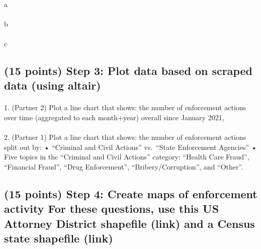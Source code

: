 \documentclass[
  letterpaper,
  DIV=11,
  numbers=noendperiod]{scrartcl}
\makeatletter
\let\oldparagraph\paragraph
\renewcommand{\paragraph}{
    \@ifstar
      \xxxParagraphStar
      \xxxParagraphNoStar
  }
\newcommand{\xxxParagraphStar}[1]{\oldparagraph*{#1}\mbox{}}
\newcommand{\xxxParagraphNoStar}[1]{\oldparagraph{#1}\mbox{}}
\makeatother
\begin{document}
\paragraph{a}\label{a}

\paragraph{b}\label{b}

\paragraph{c}\label{c}

\subsection{(15 points) Step 3: Plot data based on scraped data (using
altair)}\label{points-step-3-plot-data-based-on-scraped-data-using-altair}

\paragraph{1. (Partner 2) Plot a line chart that shows: the number of
enforcement actions over time (aggregated to each month+year) overall
since January
2021,}\label{partner-2-plot-a-line-chart-that-shows-the-number-of-enforcement-actions-over-time-aggregated-to-each-monthyear-overall-since-january-2021}

\paragraph{2. (Partner 1) Plot a line chart that shows: the number of
enforcement actions split out by: • ``Criminal and Civil Actions''
vs.~``State Enforcement Agencies'' • Five topics in the ``Criminal and
Civil Actions'' category: ``Health Care Fraud'', ``Financial Fraud'',
``Drug Enforcement'', ``Bribery/Corruption'', and
``Other''.}\label{partner-1-plot-a-line-chart-that-shows-the-number-of-enforcement-actions-split-out-by-criminal-and-civil-actions-vs.-state-enforcement-agencies-five-topics-in-the-criminal-and-civil-actions-category-health-care-fraud-financial-fraud-drug-enforcement-briberycorruption-and-other.}

\subsection{(15 points) Step 4: Create maps of enforcement activity For
these questions, use this US Attorney District shapefile (link) and a
Census state shapefile
(link)}\label{points-step-4-create-maps-of-enforcement-activity-for-these-questions-use-this-us-attorney-district-shapefile-link-and-a-census-state-shapefile-link}
\end{document}
